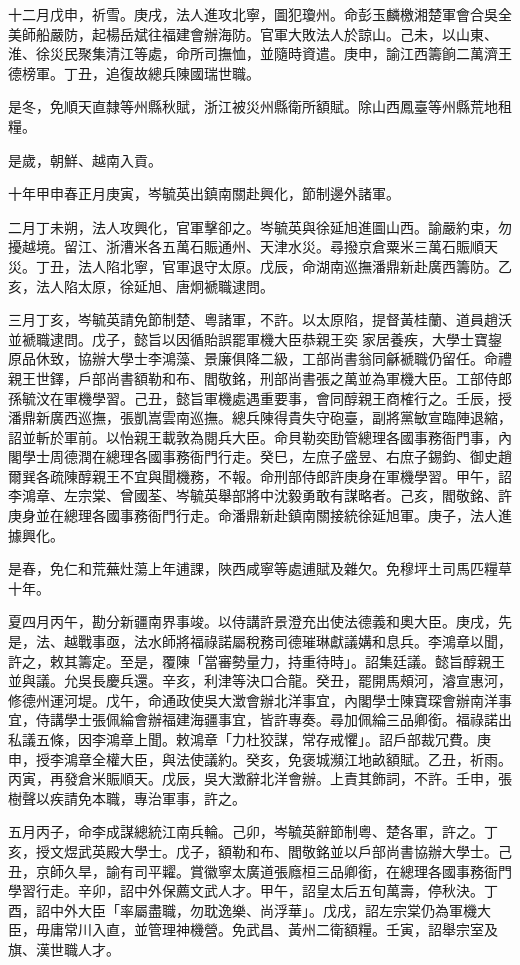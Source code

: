 \begin{pinyinscope}
十二月戊申，祈雪。庚戌，法人進攻北寧，圖犯瓊州。命彭玉麟檄湘楚軍會合吳全美師船嚴防，起楊岳斌往福建會辦海防。官軍大敗法人於諒山。己未，以山東、淮、徐災民聚集清江等處，命所司撫恤，並隨時資遣。庚申，諭江西籌餉二萬濟王德榜軍。丁丑，追復故總兵陳國瑞世職。

是冬，免順天直隸等州縣秋賦，浙江被災州縣衛所額賦。除山西鳳臺等州縣荒地租糧。

是歲，朝鮮、越南入貢。

十年甲申春正月庚寅，岑毓英出鎮南關赴興化，節制邊外諸軍。

二月丁未朔，法人攻興化，官軍擊卻之。岑毓英與徐延旭進圖山西。諭嚴約束，勿擾越境。留江、浙漕米各五萬石賑通州、天津水災。尋撥京倉粟米三萬石賑順天災。丁丑，法人陷北寧，官軍退守太原。戊辰，命湖南巡撫潘鼎新赴廣西籌防。乙亥，法人陷太原，徐延旭、唐炯褫職逮問。

三月丁亥，岑毓英請免節制楚、粵諸軍，不許。以太原陷，提督黃桂蘭、道員趙沃並褫職逮問。戊子，懿旨以因循貽誤罷軍機大臣恭親王奕家居養疾，大學士寶鋆原品休致，協辦大學士李鴻藻、景廉俱降二級，工部尚書翁同龢褫職仍留任。命禮親王世鐸，戶部尚書額勒和布、閻敬銘，刑部尚書張之萬並為軍機大臣。工部侍郎孫毓汶在軍機學習。己丑，懿旨軍機處遇重要事，會同醇親王商榷行之。壬辰，授潘鼎新廣西巡撫，張凱嵩雲南巡撫。總兵陳得貴失守砲臺，副將黨敏宣臨陣退縮，詔並斬於軍前。以怡親王載敦為閱兵大臣。命貝勒奕劻管總理各國事務衙門事，內閣學士周德潤在總理各國事務衙門行走。癸巳，左庶子盛昱、右庶子錫鈞、御史趙爾巽各疏陳醇親王不宜與聞機務，不報。命刑部侍郎許庚身在軍機學習。甲午，詔李鴻章、左宗棠、曾國荃、岑毓英舉部將中沈毅勇敢有謀略者。己亥，閻敬銘、許庚身並在總理各國事務衙門行走。命潘鼎新赴鎮南關接統徐延旭軍。庚子，法人進據興化。

是春，免仁和荒蕪灶蕩上年逋課，陜西咸寧等處逋賦及雜欠。免穆坪土司馬匹糧草十年。

夏四月丙午，勘分新疆南界事竣。以侍講許景澄充出使法德義和奧大臣。庚戌，先是，法、越戰事亟，法水師將福祿諾屬稅務司德璀琳獻議媾和息兵。李鴻章以聞，許之，敕其籌定。至是，覆陳「當審勢量力，持重待時」。詔集廷議。懿旨醇親王並與議。允吳長慶兵還。辛亥，利津等決口合龍。癸丑，罷開馬頰河，濬宣惠河，修德州運河堤。戊午，命通政使吳大澂會辦北洋事宜，內閣學士陳寶琛會辦南洋事宜，侍講學士張佩綸會辦福建海疆事宜，皆許專奏。尋加佩綸三品卿銜。福祿諾出私議五條，因李鴻章上聞。敕鴻章「力杜狡謀，常存戒懼」。詔戶部裁冗費。庚申，授李鴻章全權大臣，與法使議約。癸亥，免褒城瀕江地畝額賦。乙丑，祈雨。丙寅，再發倉米賑順天。戊辰，吳大澂辭北洋會辦。上責其飾詞，不許。壬申，張樹聲以疾請免本職，專治軍事，許之。

五月丙子，命李成謀總統江南兵輪。己卯，岑毓英辭節制粵、楚各軍，許之。丁亥，授文煜武英殿大學士。戊子，額勒和布、閻敬銘並以戶部尚書協辦大學士。己丑，京師久旱，諭有司平糶。賞徽寧太廣道張廕桓三品卿銜，在總理各國事務衙門學習行走。辛卯，詔中外保薦文武人才。甲午，詔皇太后五旬萬壽，停秋決。丁酉，詔中外大臣「率屬盡職，勿耽逸樂、尚浮華」。戊戌，詔左宗棠仍為軍機大臣，毋庸常川入直，並管理神機營。免武昌、黃州二衛額糧。壬寅，詔舉宗室及旗、漢世職人才。


\end{pinyinscope}
